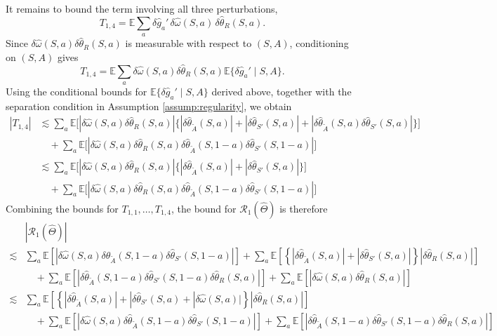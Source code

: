 \documentclass[12pt]{article}
\newcommand{\0}{\boldsymbol{0}}
\begin{document}
It remains to bound the term involving all three perturbations,
\[
T_{1,4}
=
\mathbb E\sum_a
\delta\widehat g_a'\,
\delta\widehat\omega(S,a)\,
\delta\widehat\theta_R(S,a).
\]
Since \(\delta\widehat\omega(S,a)\delta\widehat\theta_R(S,a)\) is measurable with respect to
\((S,A)\), conditioning on \((S,A)\) gives
\[
T_{1,4}
=
\mathbb E\sum_a
\delta\widehat\omega(S,a)\delta\widehat\theta_R(S,a)
\mathbb E\{\delta\widehat g_a'\mid S,A\}.
\]
Using the conditional bounds for
\(\mathbb E\{\delta\widehat g_a'\mid S,A\}\) derived above, together with the separation condition in Assumption \ref{assump:regularity}, we obtain
\[
\begin{aligned}
|T_{1,4}|
&\lesssim\sum_a\mathbb E\Big[
|\delta\widehat\omega(S,a) \delta\widehat\theta_R(S,a)|
\Big\{
|\delta\widehat\theta_{\widetilde A}(S,a)|
+|\delta\widehat\theta_{S'}(S,a)|
+|\delta\widehat\theta_{\widetilde A}(S,a)
  \delta\widehat\theta_{S'}(S,a)|
\Big\}\Big] \\
&\quad+\sum_a\mathbb E\Big[
|\delta\widehat\omega(S,a) \delta\widehat\theta_R(S,a) \delta\widehat\theta_{\widetilde A}(S,1-a)
  \delta\widehat\theta_{S'}(S,1-a)|
\Big]\\
&\lesssim\sum_a\mathbb E\Big[
|\delta\widehat\omega(S,a) \delta\widehat\theta_R(S,a)|
\Big\{
|\delta\widehat\theta_{\widetilde A}(S,a)|
+|\delta\widehat\theta_{S'}(S,a)|
\Big\}
\Big] \\
&\quad+\sum_a\mathbb E\Big[
|\delta\widehat\omega(S,a) \delta\widehat\theta_R(S,a) \delta\widehat\theta_{\widetilde A}(S,1-a)
  \delta\widehat\theta_{S'}(S,1-a)|
\Big]
\end{aligned}
\]
Combining the bounds for $T_{1,1},\ldots, T_{1,4}$, the bound for \(\mathcal R_1(\widehat\Theta)\) is therefore
\[
\begin{aligned}
&|\mathcal R_1(\widehat\Theta)| \\
\lesssim &\sum_a
\mathbb E\!\left[
|\delta\widehat\omega(S,a) \delta\widehat\theta_{\widetilde A}(S,1-a) \delta\widehat\theta_{S'}(S,1-a)|
\right] 
+\sum_a\mathbb E\!\left[\left\{
|\delta\widehat\theta_{\widetilde A}(S,a)|
+|\delta\widehat\theta_{S'}(S,a)|\right\}
|\delta\widehat\theta_R(S,a)|
\right] \\
&\quad+\sum_a\mathbb E\!\left[
|\delta\widehat\theta_{\widetilde A}(S,1-a)
\delta\widehat\theta_{S'}(S,1-a) \delta\widehat\theta_R(S,a)|\right] 
+\sum_a\mathbb E\!\left[
|\delta\widehat\omega(S,a) \delta\widehat\theta_R(S,a)|
\right] \\
\lesssim &\sum_a\mathbb E\!\left[\left\{
|\delta\widehat\theta_{\widetilde A}(S,a)|
+|\delta\widehat\theta_{S'}(S,a) + |\delta\widehat\omega(S,a)|\right\}
|\delta\widehat\theta_R(S,a)|
\right] \\
&\quad + \sum_a
\mathbb E\!\left[
|\delta\widehat\omega(S,a) \delta\widehat\theta_{\widetilde A}(S,1-a) \delta\widehat\theta_{S'}(S,1-a)|
\right] 
+\sum_a\mathbb E\!\left[
|\delta\widehat\theta_{\widetilde A}(S,1-a)
\delta\widehat\theta_{S'}(S,1-a) \delta\widehat\theta_R(S,a)|\right] 
\end{aligned}
\]
\end{document}
